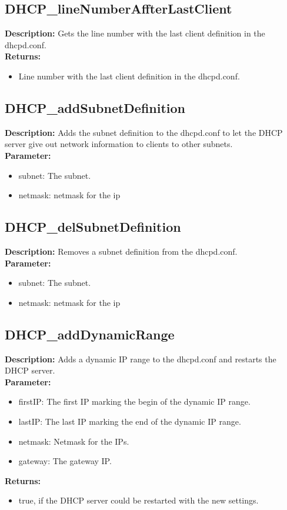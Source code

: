 \subsection{DHCP\_lineNumberAffterLastClient}
\textbf{Description:} Gets the line number with the last client definition in the dhcpd.conf.\\
\textbf{Returns:}
\begin{itemize}
\item Line number with the last client definition in the dhcpd.conf.
\end{itemize}

\subsection{DHCP\_addSubnetDefinition}
\textbf{Description:} Adds the subnet definition to the dhcpd.conf to let the DHCP server give out network information to clients to other subnets.\\
\textbf{Parameter:}
\begin{itemize}
\item subnet: The subnet.
\item netmask: netmask for the ip
\end{itemize}

\subsection{DHCP\_delSubnetDefinition}
\textbf{Description:} Removes a subnet definition from the dhcpd.conf.\\
\textbf{Parameter:}
\begin{itemize}
\item subnet: The subnet.
\item netmask: netmask for the ip
\end{itemize}

\subsection{DHCP\_addDynamicRange}
\textbf{Description:} Adds a dynamic IP range to the dhcpd.conf and restarts the DHCP server.\\
\textbf{Parameter:}
\begin{itemize}
\item firstIP: The first IP marking the begin of the dynamic IP range.
\item lastIP: The last IP marking the end of the dynamic IP range.
\item netmask: Netmask for the IPs.
\item gateway: The gateway IP.
\end{itemize}
\textbf{Returns:}
\begin{itemize}
\item true, if the DHCP server could be restarted with the new settings.
\end{itemize}


